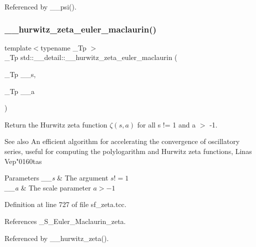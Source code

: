 Referenced by \+\_\+\+\_\+psi().

\mbox{\label{namespacestd_1_1____detail_a56c55858723fe9e0c541f0e77572b58d}} 
\subsubsection{\texorpdfstring{\+\_\+\+\_\+hurwitz\+\_\+zeta\+\_\+euler\+\_\+maclaurin()}{\_\_hurwitz\_zeta\_euler\_maclaurin()}}
{\footnotesize\ttfamily template$<$typename \+\_\+\+Tp $>$ \\
\+\_\+\+Tp std\+::\+\_\+\+\_\+detail\+::\+\_\+\+\_\+hurwitz\+\_\+zeta\+\_\+euler\+\_\+maclaurin (\begin{DoxyParamCaption}\item[{\+\_\+\+Tp}]{\+\_\+\+\_\+s,  }\item[{\+\_\+\+Tp}]{\+\_\+\+\_\+a }\end{DoxyParamCaption})}



Return the Hurwitz zeta function $ \zeta(s,a) $ for all s != 1 and a $>$ -\/1. 

\begin{DoxySeeAlso}{See also}
An efficient algorithm for accelerating the convergence of oscillatory series, useful for computing the polylogarithm and Hurwitz zeta functions, Linas Vep"0160tas
\end{DoxySeeAlso}

\begin{DoxyParams}{Parameters}
{\em \+\_\+\+\_\+s} & The argument $ s != 1 $ \\
\hline
{\em \+\_\+\+\_\+a} & The scale parameter $ a > -1 $ \\
\hline
\end{DoxyParams}


Definition at line 727 of file sf\+\_\+zeta.\+tcc.



References \+\_\+\+S\+\_\+\+Euler\+\_\+\+Maclaurin\+\_\+zeta.



Referenced by \+\_\+\+\_\+hurwitz\+\_\+zeta().

